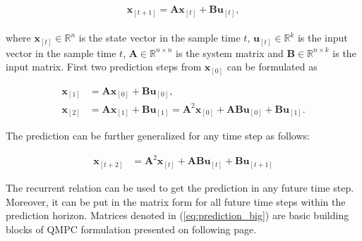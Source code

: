 \begin{equation}
\textbf{x}_{[t+1]} = \textbf{A}\textbf{x}_{[t]} + \textbf{B}\textbf{u}_{[t]},
\label{eq:mpc_lti_system}
\end{equation}
\\
where $\textbf{x}_{[t]} \in \mathbb{R}^{n}$ is the state vector in the sample time $t$, $\textbf{u}_{[t]} \in \mathbb{R}^k$ is the input vector in the sample time $t$, $\textbf{A} \in \mathbb{R}^{n\times n}$ is the system matrix and $\textbf{B} \in \mathbb{R}^{n\times k}$ is the input matrix. First two prediction steps from $\textbf{x}_{[0]}$ can be formulated as

\begin{equation}
\begin{split}
\textbf{x}_{[1]} &= \textbf{A}\textbf{x}_{[0]} + \textbf{B}\textbf{u}_{[0]}, \\
\textbf{x}_{[2]} &= \textbf{A}\textbf{x}_{[1]} + \textbf{B}\textbf{u}_{[1]} = \textbf{A}^2\textbf{x}_{[0]} + \textbf{A}\textbf{B}\textbf{u}_{[0]} + \textbf{B}\textbf{u}_{[1]}.
\end{split}
\end{equation}

The prediction can be further generalized for any time step as follows:

\begin{equation}
\begin{split}
\textbf{x}_{[t+2]} &= \textbf{A}^2\textbf{x}_{[t]} + \textbf{A}\textbf{B}\textbf{u}_{[t]} + \textbf{B}\textbf{u}_{[t+1]}
\end{split}
\end{equation}

The recurrent relation can be used to get the prediction in any future time step.  Moreover, it can be put in the matrix form for all future time steps within the prediction horizon. Matrices denoted in (\ref{eq:prediction_big}) are basic building blocks of QMPC formulation presented on following page.

